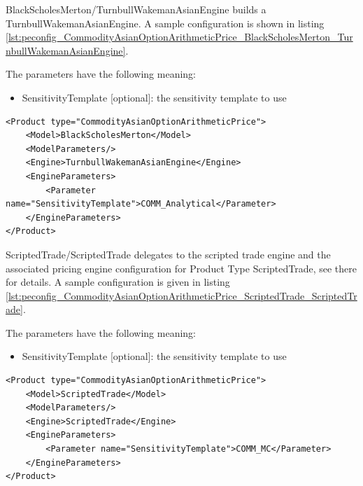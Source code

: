 BlackScholesMerton/TurnbullWakemanAsianEngine builds a TurnbullWakemanAsianEngine. A sample configuration is shown in
listing \ref{lst:peconfig_CommodityAsianOptionArithmeticPrice_BlackScholesMerton_TurnbullWakemanAsianEngine}.

The parameters have the following meaning:

\begin{itemize}
\item SensitivityTemplate [optional]: the sensitivity template to use
\end{itemize}

\begin{longlisting}
\begin{verbatim}
<Product type="CommodityAsianOptionArithmeticPrice">
    <Model>BlackScholesMerton</Model>
    <ModelParameters/>
    <Engine>TurnbullWakemanAsianEngine</Engine>
    <EngineParameters>
        <Parameter name="SensitivityTemplate">COMM_Analytical</Parameter>
    </EngineParameters>
</Product>
\end{verbatim}
\caption{Configuration for Product CommodityAsianOptionArithmeticPrice, Model BlackScholesMerton, Engine TurnbullWakemanAsianEngine}
\label{lst:peconfig_CommodityAsianOptionArithmeticPrice_BlackScholesMerton_TurnbullWakemanAsianEngine}
\end{longlisting}

ScriptedTrade/ScriptedTrade delegates to the scripted trade engine and the associated pricing engine configuration for
Product Type ScriptedTrade, see there for details. A sample configuration is given in listing
\ref{lst:peconfig_CommodityAsianOptionArithmeticPrice_ScriptedTrade_ScriptedTrade}.

The parameters have the following meaning:

\begin{itemize}
\item SensitivityTemplate [optional]: the sensitivity template to use
\end{itemize}

\begin{longlisting}
\begin{verbatim}
<Product type="CommodityAsianOptionArithmeticPrice">
    <Model>ScriptedTrade</Model>
    <ModelParameters/>
    <Engine>ScriptedTrade</Engine>
    <EngineParameters>
        <Parameter name="SensitivityTemplate">COMM_MC</Parameter>
    </EngineParameters>
</Product>
\end{verbatim}
\caption{Configuration for Product CommodityAsianOptionArithmeticPrice, Model ScriptedTrade, Engine ScriptedTrade}
\label{lst:peconfig_CommodityAsianOptionArithmeticPrice_ScriptedTrade_ScriptedTrade}
\end{longlisting}


